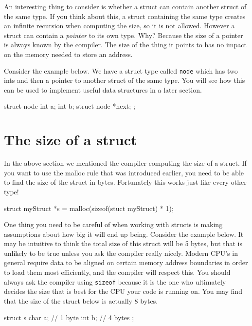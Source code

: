 An interesting thing to consider is whether a struct can contain another struct of the same type.
If you think about this, a struct containing the same type creates an infinite recursion when computing the size, so it is not allowed.
However a struct can contain a \emph{pointer} to its own type.
Why?
Because the size of a pointer is always known by the compiler.
The size of the thing it points to has no impact on the memory needed to store an address.

Consider the example below.
We have a struct type called \texttt{node} which has two ints and then a pointer to another struct of the same type.
You will see how this can be used to implement useful data structures in a later section.

\begin{codeblock}
struct node {
    int a;
    int b;
    struct node *next;
};
\end{codeblock}

\section{The size of a struct}

In the above section we mentioned the compiler computing the size of a struct.
If you want to use the malloc rule that was introduced earlier, you need to be able to find the size of the struct in bytes.
Fortunately this works just like every other type!

\begin{codeinline}
struct myStruct *s = malloc(sizeof(stuct myStruct) * 1);
\end{codeinline}

One thing you need to be careful of when working with structs is making assumptions about how big it will end up being.
Consider the example below.
It may be intuitive to think the total size of this struct will be 5 bytes, but that is unlikely to be true unless you ask the compiler really nicely.
Modern CPU's in general require data to be aligned on certain memory address boundaries in order to load them most efficiently, and the compiler will respect this.
You should always ask the compiler using \texttt{sizeof} because it is the one who ultimately decides the size that is best for the CPU your code is running on.
You may find that the size of the struct below is actually 8 bytes.

\begin{codeblock}
struct s {
    char a; // 1 byte
    int b; // 4 bytes
};
\end{codeblock}

